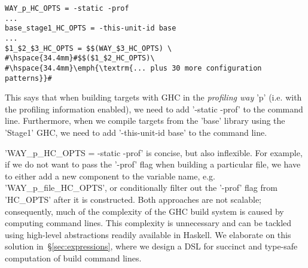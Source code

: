 \begin{lstlisting}
WAY_p_HC_OPTS = -static -prof
...
base_stage1_HC_OPTS = -this-unit-id base
...
$1_$2_$3_HC_OPTS = $$(WAY_$3_HC_OPTS) \
#\hspace{34.4mm}#$$($1_$2_HC_OPTS)\
#\hspace{34.4mm}\emph{\textrm{... plus 30 more configuration patterns}}#
\end{lstlisting}

\noindent This says that when building targets with GHC in the \emph{profiling
way} \lst'p' (i.e. with the profiling information enabled), we need to add
\lst'-static -prof' to the command line. Furthermore, when we compile targets
from the \lst'base' library using the \lst'Stage1' GHC, we need to add
\lst'-this-unit-id base' to the command line.

\lst'WAY_p_HC_OPTS = -static -prof' is concise, but also inflexible. For example,
if we do not want to pass the \lst'-prof' flag when building a particular file, we
have to either add a new component to the variable name, e.g.
\lst'WAY_p_file_HC_OPTS', or conditionally filter out the \lst'-prof' flag from
\lst'HC_OPTS' after it is constructed. Both
approaches are not scalable; consequently, much of the complexity of the GHC
build system is caused by computing command lines. This complexity is
unnecessary and can be tackled using high-level abstractions readily available
in Haskell. We elaborate on this solution in~\S\ref{sec:expressions}, where we design a
DSL for succinct and type-safe computation of build command lines.

%
%

